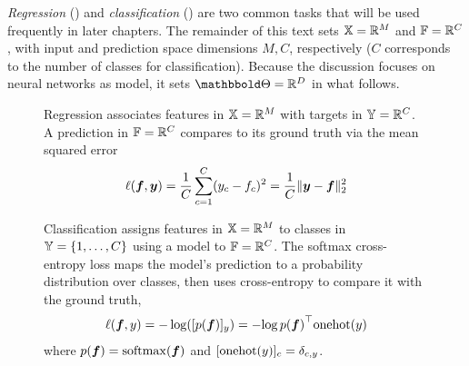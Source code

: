 \emph{Regression} () and \emph{classification}
() are two common tasks that will be used
frequently in later chapters. The remainder of this text sets ${\mathbb{X}} = {\mathbb{R}}^{M}$
and ${\mathbb{F}} = {\mathbb{R}}^{C}$, with input and prediction space dimensions $M, C$,
respectively ($C$ corresponds to the number of classes for classification).
Because the discussion focuses on neural networks as model, it sets $\sTheta =
\sR^{D}$ in what follows.

\begin{figure}[!b]
  \begin{example}\label{ex:background::Regression}
    Regression associates features in ${\mathbb{X}} = {\mathbb{R}}^M$ with targets in ${\mathbb{Y}} =
    {\mathbb{R}}^C$. A prediction in ${\mathbb{F}} = {\mathbb{R}}^{C}$ compares to its ground truth via the
    mean squared error
    \begin{align}\label{eq:background::squareLoss}
      \ell({\bm{f}}, {\bm{y}})
      =
      \frac{1}{C} \sum_{c=1}^C ({y}_c - {f}_c)^2
      =
      \frac{1}{C} \lVert {\bm{y}} - {\bm{f}}  \rVert_{2}^{2}
    \end{align}
  \end{example}
  \begin{example}\label{ex:background::Classification}
    Classification assigns features in ${\mathbb{X}} = {\mathbb{R}}^{M}$ to classes in ${\mathbb{Y}} =
    \left\{ 1, \dots, C \right\}$ using a model to ${\mathbb{F}} = {\mathbb{R}}^C$. The softmax
    cross-entropy loss%
    maps the model's prediction to a probability distribution over classes, then
    uses cross-entropy to compare it with the ground truth,
    \begin{align}
      \label{eq:background::softmaxCrossEntropyLoss}
      \ell({\bm{f}}, y) = - \log([p({\bm{f}})]_{y})
      =
      - {\log p({\bm{f}})}^\top \mathrm{onehot}(y)
    \end{align}
    where $p({\bm{f}}) = \mathrm{softmax}({\bm{f}})$ and $[\mathrm{onehot}(y)]_{c} = \delta_{c,y}$.
  \end{example}
\end{figure}

